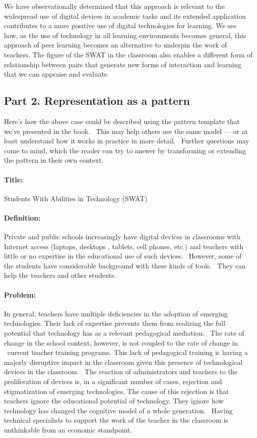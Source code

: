 We have observationally determined that this approach is relevant to the
widespread use of digital devices in academic tasks and its extended
application contributes to a more positive use of digital technologies
for learning. We see how, as the use of technology in all learning
environments becomes general, this approach of peer learning becomes an
alternative to underpin the work of teachers. The figure of the SWAT in
the classroom also enables a different form of relationship between
pairs that generate new forms of interaction and learning that we can
appraise and evaluate.

\subsection{Part 2. Representation as a pattern}

Here's how the above case could be described using the pattern template
that we've presented in the book. ~This may help others use the same
model --- or at least understand how it works in practice in more
detail. ~Further questions may come to mind, which the reader can try to
answer by transforming or extending the pattern in their own context.

\paragraph{Title:} Students With Abilities in Technology (SWAT)

\paragraph{Definition:}
Private and public schools increasingly have digital devices in
classrooms with Internet access (laptops, desktops , tablets, cell
phones, etc.) and teachers with little or no expertise in the
educational use of such devices. ~However, some of the students have
considerable background with these kinds of tools.~ They can help the
teachers and other students.

\paragraph{Problem:}
In general, teachers have multiple deficiencies in the adoption of
emerging technologies. Their lack of expertise prevents them from
realizing the full potential that technology has as a relevant
pedagogical mediation. ~The rate of change in the school context,
however, is not coupled to the rate of change in ~current teacher
training programs. This lack of pedagogical training is having a majorly
disruptive impact in the classroom given this presence of technological
devices in the classroom. ~The reaction of administrators and teachers
to the proliferation of devices is, in a significant number of cases,
rejection and stigmatization of emerging technologies. The cause of this
rejection is that teachers ignore the educational potential of
technology. They ignore how technology has changed the cognitive model
of a whole generation. ~Having technical specialists to support the work
of the teacher in the classroom is unthinkable from an economic
standpoint.

